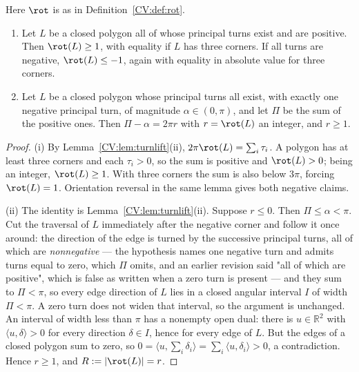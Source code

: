 \begin{lemma}
\label{CV:lem:uniformrot}\leanok
Here $\rot$ is as in Definition~\ref{CV:def:rot}.
\begin{enumerate}
\item[(i)] Let $L$ be a closed polygon all of whose principal turns exist and are
positive. Then $\rot(L)\geq1$, with equality if $L$ has three corners. If all
turns are negative, $\rot(L)\leq-1$, again with equality in absolute value for
three corners.
\item[(ii)] Let $L$ be a closed polygon whose principal turns all exist, with
exactly one negative principal turn, of magnitude $\alpha\in(0,\pi)$, and let
$\Pi$ be the sum of the positive ones. Then
$\Pi-\alpha=2\pi r$ with $r=\rot(L)$ an integer, and $r\geq1$.
\end{enumerate}
\end{lemma}
\begin{proof}\leanok{}
(i) By Lemma~\ref{CV:lem:turnlift}(ii),
$2\pi\rot(L)=\sum_i\tau_i$. A polygon has at least three corners and each
$\tau_i>0$, so the sum is positive and $\rot(L)>0$; being an integer,
$\rot(L)\geq1$. With three corners the sum is also below $3\pi$, forcing
$\rot(L)=1$. Orientation reversal in the same lemma gives both negative
claims.

(ii) The identity is Lemma~\ref{CV:lem:turnlift}(ii). Suppose $r\leq0$. Then
$\Pi\leq\alpha<\pi$. Cut the traversal of $L$ immediately after the negative
corner and follow it once around: the direction of the edge is turned by the
successive principal turns, all of which are \emph{nonnegative} --- the
hypothesis names one negative turn and admits turns equal to zero, which $\Pi$
omits, and an earlier revision said "all of which are positive", which is false
as written when a zero turn is present --- and they sum to $\Pi<\pi$, so every
edge direction of $L$ lies in a closed angular interval $I$ of width $\Pi<\pi$.
A zero turn does not widen that interval, so the argument is unchanged. An
interval of width less than $\pi$ has a nonempty open dual: there is
$u\in\mathbb R^2$ with $\langle u,\delta\rangle>0$ for every direction
$\delta\in I$, hence for every edge of $L$. But the edges of a closed polygon
sum to zero, so
$0=\langle u,\sum_i\delta_i\rangle=\sum_i\langle u,\delta_i\rangle>0$, a
contradiction. Hence $r\geq1$, and $R:=|\rot(L)|=r$.
\end{proof}

